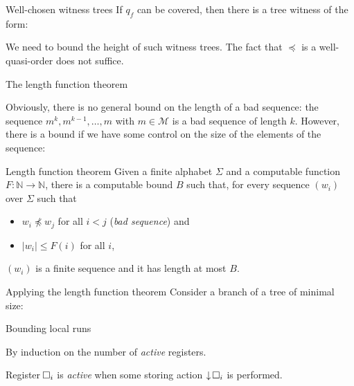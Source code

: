 \documentclass{beamer}
\newcommand{\messages}{\mathcal{M}}
\newcommand{\reg}{\hspace{-0.5mm}\square}
\begin{document}
\begin{frame}{Well-chosen witness trees}
If $q_f$ can be covered, then there is a tree witness of the form:
\begin{center}
\resizebox{!}{5.5cm}{

}
\end{center}

\pause 
We need to bound the height of such witness trees. The fact that $\preceq$ is a well-quasi-order does not suffice. 
\end{frame}

\begin{frame}{The length function theorem} 

Obviously, there is no general bound on the length of a bad sequence: the sequence $m^k, m^{k-1}, \dots, m$ with $m \in \messages$ is a bad sequence of length $k$.  
	\pause
	However, there is a bound if we have some control on the size of the elements of the sequence:

\begin{block}{Length function theorem\footnotemark}
	Given a finite alphabet $\Sigma$ and a computable function $F : \mathbb{N} \to \mathbb{N}$, there is a computable bound $B$ such that, for every sequence $(w_i)$ over $\Sigma$ such that
	\begin{itemize}
		\item $w_i \npreceq w_j$ for all $i<j$ (\emph{bad sequence}) and
		\item $|w_i| \leq F(i)$ for all $i$,
	\end{itemize}
$(w_i)$ is a finite sequence and it has length at most $B$.
\end{block}
\end{frame}


\begin{frame}{Applying the length function theorem}
Consider a branch of a tree of minimal size: \vspace{0.2cm} 

\begin{center}
\resizebox{!}{4.5cm}{

}
\end{center}

\end{frame}

\begin{frame}{Bounding local runs}
	
	
	By induction on the number of \color{blue}\emph{active }\color{black} registers.
	
	Register $\reg_i$ is \emph{active} when some storing action $\downarrow \reg_i$ is performed. 
	\vspace{0.5cm}
	
	
	
\end{frame}
\end{document}
